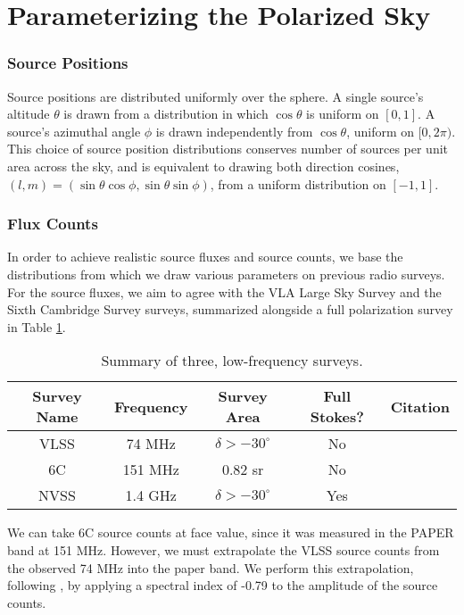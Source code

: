 \section{Parameterizing the Polarized Sky}
\label{sec:sim_params}

\subsubsection*{Source Positions}
Source positions are distributed uniformly over the sphere. A single source's altitude $\theta$ is
drawn from a distribution in which $\cos\theta$ is uniform on $[0,1]$. A source's azimuthal angle
$\phi$ is drawn independently from $\cos\theta$, uniform on $[0,2\pi)$. This choice of source
position distributions conserves number of sources per unit area across the sky, and is equivalent
to drawing both direction cosines, $(l,m) = (\sin\theta\cos\phi, \sin\theta\sin\phi)$, from a
uniform distribution on $[-1,1]$.

\subsubsection*{Flux Counts}
In order to achieve realistic source fluxes and source counts, we base the distributions from which
we draw various parameters on previous radio surveys. For the source fluxes, we aim to agree with
the VLA Large Sky Survey \cite[henceforth, called
VLSS]{VLSS} and the Sixth Cambridge Survey
\cite[henceforth, called 6C]{Hales1988} surveys, summarized alongside a full polarization
survey in Table \ref{tab:surveys}.
\begin{table}
  \begin{center}
    \begin{tabular}{c c c c c}
      {\bf Survey Name} & {\bf Frequency} & {\bf Survey Area} & {\bf Full Stokes?} & Citation\\ 
      \hline\hline
      VLSS &  74 MHz & $\delta > -30^\circ$ &  No & \citet{VLSS} \\
      6C   & 151 MHz & 0.82 sr              &  No & \citet{Hales1988} \\
      NVSS & 1.4 GHz & $\delta > -30^\circ$ & Yes & \citet{NVSS} \\
    \end{tabular}
  \end{center}
  \caption[Summary of three, low-frequency surveys]{\label{tab:surveys} Summary of three,
  low-frequency surveys.}
\end{table}
We can take 6C source counts at face value, since it was measured in the PAPER band at 151 MHz.
However, we must extrapolate the VLSS source counts from the observed 74 MHz into the paper band. We
perform this extrapolation, following \citet{Cohen2004}, by applying a spectral index of -0.79 to the
amplitude of the source counts.


